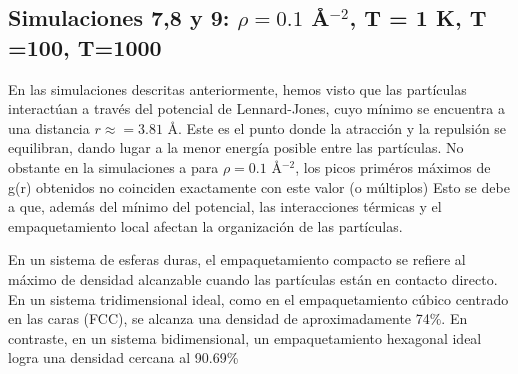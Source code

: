 \subsection{Simulaciones 7,8 y 9: $\rho = 0.1$ \AA$^{-2}$, T = 1 K, T =100, T=1000}
En las simulaciones descritas anteriormente,  hemos visto que las partículas interactúan a través del potencial de Lennard-Jones, cuyo mínimo se encuentra a una distancia $r\approx=3.81$ \AA. Este es el punto donde la atracción y la repulsión se equilibran, dando lugar a la menor energía posible entre las partículas. No obstante en la simulaciones a para $\rho=0.1$ \AA$^{-2}$, los picos priméros máximos de g(r) obtenidos no coinciden exactamente con este valor (o múltiplos) Esto se debe a que, además del mínimo del potencial, las interacciones térmicas y el empaquetamiento local afectan la organización de las partículas.

\vspace{\baselineskip}

En un sistema de esferas duras, el empaquetamiento compacto se refiere al máximo de densidad alcanzable cuando las partículas están en contacto directo. En un sistema tridimensional ideal, como en el empaquetamiento cúbico centrado en las caras (FCC), se alcanza una densidad de aproximadamente 74\%. En contraste, en un sistema bidimensional, un empaquetamiento hexagonal ideal logra una densidad cercana al 90.69\%

